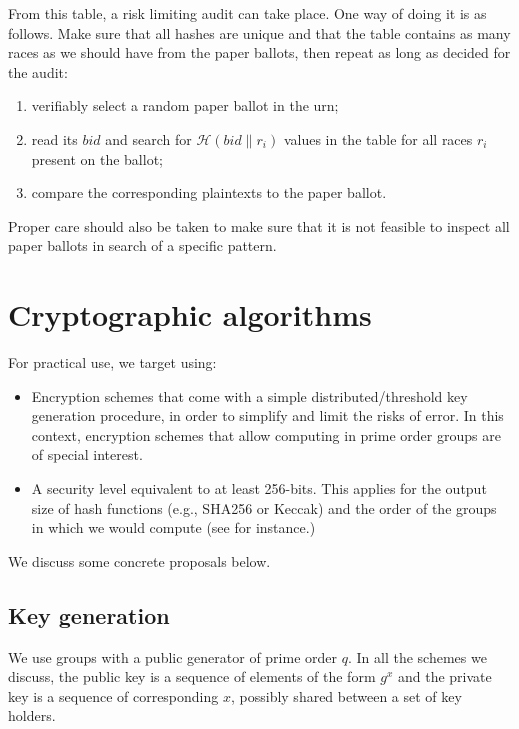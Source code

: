 \documentclass[prodmode]{acmsmall}
\newcommand{\bid}{\ensuremath{bid}\xspace}   %
\newcommand{\hash}{\ensuremath{\mathcal{H}}\xspace} %
\begin{document}
From this table, a risk limiting audit can take place. One way of
doing it is as follows. Make sure that all hashes are unique and that
the table contains as many races as we should have from the paper
ballots, then repeat as long as decided for the audit:
\begin{enumerate}
\item verifiably select a random paper ballot in the urn;
\item read its \bid and search for $\hash(\bid\|r_i)$ values in the
  table for all races $r_i$ present on the ballot;
\item compare the corresponding plaintexts to the paper ballot.
\end{enumerate}

Proper care should also be taken to make sure that it is not feasible
to inspect all paper ballots in search of a specific pattern.%

\section{Cryptographic algorithms}

For practical use, we target using:
\begin{itemize}
\item Encryption schemes that come with a simple distributed/threshold
  key generation procedure, in order to simplify and limit the risks
  of error. In this context, encryption schemes that allow computing
  in prime order groups are of special interest. 
\item A security level equivalent to at least 256-bits. This applies
  for the output size of hash functions (e.g., SHA256 or Keccak) and
  the order of the groups in which we would compute (see
  \cite{keylength} for instance.)
\end{itemize}

We discuss some concrete proposals below. 

\subsection{Key generation}
\label{sec:key-generation}

We use groups with a public generator of prime order $q$. In all the
schemes we discuss, the public key is a sequence of elements of the
form $g^x$ and the private key is a sequence of corresponding $x$,
possibly shared between a set of key holders.
\end{document}
